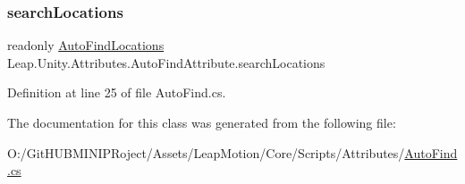 \subsubsection{\texorpdfstring{searchLocations}{searchLocations}}
{\footnotesize\ttfamily readonly \mbox{\hyperlink{namespace_leap_1_1_unity_1_1_attributes_a4b8f0ac9a7b74b480178dc5fb4069a89}{Auto\+Find\+Locations}} Leap.\+Unity.\+Attributes.\+Auto\+Find\+Attribute.\+search\+Locations}



Definition at line 25 of file Auto\+Find.\+cs.



The documentation for this class was generated from the following file\+:\begin{DoxyCompactItemize}
\item 
O\+:/\+Git\+H\+U\+B\+M\+I\+N\+I\+P\+Roject/\+Assets/\+Leap\+Motion/\+Core/\+Scripts/\+Attributes/\mbox{\hyperlink{_auto_find_8cs}{Auto\+Find.\+cs}}\end{DoxyCompactItemize}

